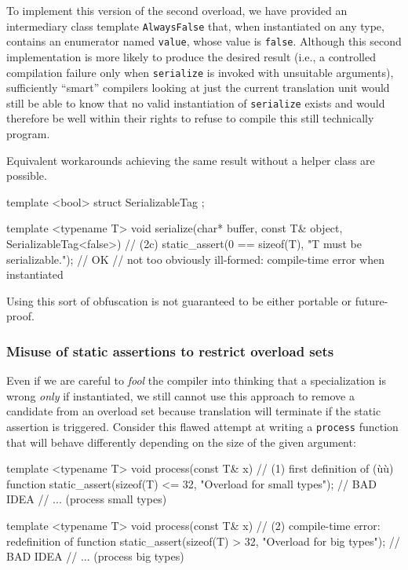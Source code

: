 \noindent To implement this version of the second overload, we have provided an
intermediary class template \lstinline!AlwaysFalse! that, when instantiated
on any type, contains an enumerator named \lstinline!value!, whose value is
\lstinline!false!. Although this second implementation is more likely to
produce the desired result (i.e., a controlled compilation failure
only when \lstinline!serialize! is invoked with unsuitable arguments),
sufficiently ``smart'' compilers looking at just the current translation
unit would still be able to know that no valid instantiation of
\lstinline!serialize! exists and would therefore be well within their
rights to refuse to compile this still technically 
program.

Equivalent workarounds achieving the same result without a
helper class are possible.

\begin{emcppshiddenlisting}[emcppsbatch=e5]
template <bool>
struct SerializableTag { };
\end{emcppshiddenlisting}
\begin{emcppslisting}[emcppsbatch=e5]
template <typename T>
void serialize(char* buffer, const T& object, SerializableTag<false>)  // (2c)
{
    static_assert(0 == sizeof(T), "T must be serializable.");  // OK
         // not too obviously ill-formed: compile-time error when instantiated
}
\end{emcppslisting}

\noindent Using this sort of obfuscation is not guaranteed to be either
portable or future-proof.

\subsubsection[Misuse of static assertions to restrict overload sets]{Misuse of static assertions to restrict overload sets}\label{misuse-of-static-assertions-to-restrict-overload-sets}

Even if we are careful to \emph{fool} the compiler into thinking that a
specialization is wrong \emph{only} if instantiated, we still cannot use
this approach to remove a candidate from an overload set because translation
will terminate if the static assertion is triggered. Consider this
flawed attempt at writing a \lstinline!process! function that will behave
differently depending on the size of the given argument:

\begin{emcppslisting}[emcppserrorlines={8,9,10,11,12,13}]
template <typename T>
void process(const T& x)  // (1) first definition of (ù{}ù) function
{
    static_assert(sizeof(T) <= 32, "Overload for small types");  // BAD IDEA
    // ... (process small types)
}

template <typename T>
void process(const T& x)  // (2) compile-time error: redefinition of function
{
    static_assert(sizeof(T) > 32, "Overload for big types");     // BAD IDEA
    // ... (process big types)
}
\end{emcppslisting}

